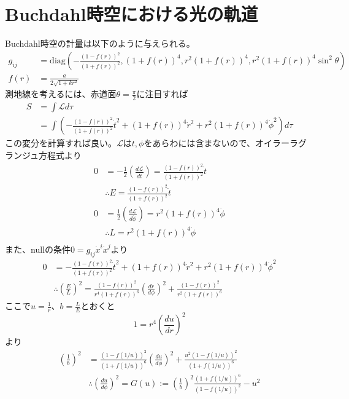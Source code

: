 \documentclass[dvipdfmx]{report} %
\begin{document}
\section{Buchdahl時空における光の軌道}
Buchdahl時空の計量は以下のように与えられる。
\begin{equation*}
\begin{split}
	g_{ij} &= \mathrm{diag}
	\left(
		- \frac{(1 - f(r))^2}{(1 + f(r))^2},
		(1 + f(r))^4,
		r^2(1 + f(r))^4 ,
		r^2 (1 + f(r))^4 \sin ^2 \theta 
	\right)\\
	f(r) &= \frac{a}{2\sqrt{1 + k r^2}} 
\end{split}
\end{equation*}
測地線を考えるには、赤道面$ \theta = \frac{\pi}{2} $に注目すれば
\begin{equation*}
\begin{split}
	S &= \int \mathcal{L} d\tau \\
	&= \int \left(
		- \frac{(1 - f(r))^2}{(1 + f(r))^2} \dot{t}^2
		+ (1 + f(r))^4 \dot{r}^2
		+ r^2(1 + f(r))^4 \dot{\phi}^2
	\right) d\tau
\end{split}
\end{equation*}
この変分を計算すれば良い。$ \mathcal{L} $は$t, \phi$をあらわには含まないので、オイラーラグランジュ方程式より
\begin{equation*}
\begin{split}
	0 &
		= - \frac{1}{2}\left( \frac{d\mathcal{L}}{d\dot{t}} \right)
		= \frac{ (1 - f(r))^2 }{(1 + f(r))^2} \dot{t}\\
	&\therefore  E = \frac{(1 - f(r))^2 }{(1 + f(r))^2} \dot{t}\\
	0 &
		= \frac{1}{2}\left( \frac{d\mathcal{L}}{d\dot{\phi}} \right)
		= r^2 (1 + f(r))^4  \dot{\phi}\\
	&\therefore  L = r^2 (1 + f(r))^4  \dot{\phi}\\
\end{split}
\end{equation*}
また、nullの条件$0 = g_{ij}\dot{x}^i\dot{x}^j$より
\begin{equation*}
\begin{split}
	0 &=
		- \frac{(1 - f(r))^2}{(1 + f(r))^2} \dot{t}^2
		+ (1 + f(r))^4 \dot{r}^2
		+ r^2(1 + f(r))^4 \dot{\phi}^2\\
	& \therefore 
		\left( \frac{E}{L} \right)^2 =
			\frac{(1 - f(r))^2}{r^4 (1 + f(r))^6} \left( \frac{dr}{d\phi} \right)^2
			+ \frac{(1 - f(r))^2}{r^2 (1 + f(r))^6}
\end{split}
\end{equation*}
ここで$u = \frac{1}{r}$、$b = \frac{L}{E}$とおくと
\[ 1 = r^4 \left( \frac{du}{dr} \right) ^2 \]より
\begin{equation*}
\begin{split}
	\left( \frac{1}{b} \right)^2 &=
		\frac{(1 - f(1/u))^2}{(1 + f(1/u))^6} \left( \frac{du}{d\phi} \right)^2
		+ \frac{u^2 (1 - f(1/u))^2}{(1 + f(1/u))^6}\\
	& \therefore \left( \frac{du}{d\phi} \right)^2 = G(u) :=
		\left( \frac{1}{b} \right)^2 \frac{(1 + f(1/u))^6}{(1 - f(1/u))^2} - u^2
\end{split}
\end{equation*}
\end{document}
